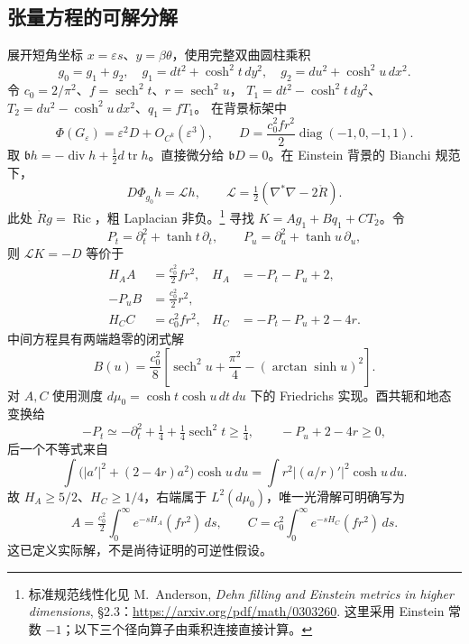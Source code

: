 \documentclass[UTF8,fontset=fandol,zihao=-4,oneside,openany]{ctexbook}
\theoremstyle{cjkplain}
\numberwithin{equation}{chapter}
\begin{document}
\subsection{张量方程的可解分解}
展开短角坐标 $x=\varepsilon s$、$y=\beta\theta$，使用完整双曲圆柱乘积
\[
 g_0=g_1+g_2,\quad g_1=dt^2+\cosh^2t\,dy^2,
 \quad g_2=du^2+\cosh^2u\,dx^2.
\]
令 $c_0=2/\pi^2$、$f=\operatorname{sech}^2t$、$r=\operatorname{sech}^2u$，
$T_1=dt^2-\cosh^2t\,dy^2$、$T_2=du^2-\cosh^2u\,dx^2$、$q_1=fT_1$。
在背景标架中
\begin{equation}
 \Phi(G_\varepsilon)=\varepsilon^2D+O_{C^k}(\varepsilon^3),
 \qquad D=\frac{c_0^2fr^2}{2}\operatorname{diag}(-1,0,-1,1).
 \label{BUN:second-source}
\end{equation}
取 $\mathfrak b h=-\operatorname{div}h+\frac12d\operatorname{tr}h$。直接微分给 $\mathfrak bD=0$。在 Einstein 背景的 Bianchi 规范下，
\[
 D\Phi_{g_0}h=\mathcal Lh,\qquad
 \mathcal L=\tfrac12(\nabla^*\nabla-2\mathring R).
\]
此处 $\mathring Rg=\operatorname{Ric}$，粗 Laplacian 非负。\footnote{标准规范线性化见 M.~Anderson, \emph{Dehn filling and Einstein metrics in higher dimensions}, \S2.3：\url{https://arxiv.org/pdf/math/0303260}. 这里采用 Einstein 常数 $-1$；以下三个径向算子由乘积连接直接计算。}
寻找 $K=Ag_1+Bq_1+CT_2$。令
\[
 P_t=\partial_t^2+\tanh t\,\partial_t,\qquad
 P_u=\partial_u^2+\tanh u\,\partial_u,
\]
则 $\mathcal LK=-D$ 等价于
\begin{equation}
 \begin{aligned}
 H_AA&=\tfrac{c_0^2}{2}fr^2,& H_A&=-P_t-P_u+2,\\
 -P_uB&=\tfrac{c_0^2}{2}r^2,\\
 H_CC&=c_0^2fr^2,& H_C&=-P_t-P_u+2-4r.
 \end{aligned}
 \label{BUN:three-equations}
\end{equation}
中间方程具有两端趋零的闭式解
\begin{equation}
 B(u)=\frac{c_0^2}{8}\left[
 \operatorname{sech}^2u+\frac{\pi^2}{4}-(\arctan\sinh u)^2\right].
 \label{BUN:B-solution}
\end{equation}
对 $A,C$ 使用测度 $d\mu_0=\cosh t\cosh u\,dt\,du$ 下的 Friedrichs 实现。酉共轭和地态变换给
\[
 -P_t\simeq-\partial_t^2+\tfrac14+\tfrac14\operatorname{sech}^2t\ge\tfrac14,
 \qquad -P_u+2-4r\ge0,
\]
后一个不等式来自
\[
 \int\bigl(|a'|^2+(2-4r)a^2\bigr)\cosh u\,du
 =\int r^2|(a/r)'|^2\cosh u\,du.
\]
故 $H_A\ge5/2$、$H_C\ge1/4$，右端属于 $L^2(d\mu_0)$，唯一光滑解可明确写为
\[
 A=\tfrac{c_0^2}{2}\int_0^\infty e^{-sH_A}(fr^2)\,ds,
 \qquad C=c_0^2\int_0^\infty e^{-sH_C}(fr^2)\,ds.
\]
这已定义实际解，不是尚待证明的可逆性假设。
\end{document}

